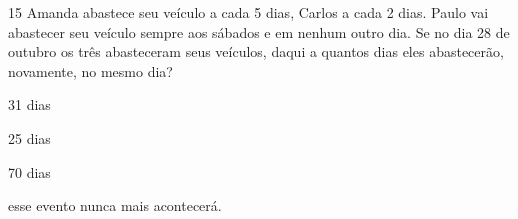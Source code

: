 





\num{15} Amanda abastece seu veículo a cada 5 dias, Carlos a cada 2 dias.
Paulo vai abastecer seu veículo sempre aos sábados e em nenhum outro
dia. Se no dia 28 de outubro os três abasteceram seus veículos, daqui a
quantos dias eles abastecerão, novamente, no mesmo dia?
\item 31 dias
\item 25 dias
\item 70 dias
\item esse evento nunca mais acontecerá.






